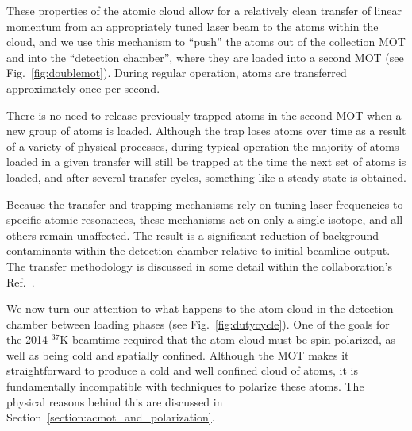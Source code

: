 These properties of the atomic cloud allow for a relatively clean transfer of linear momentum from an appropriately tuned laser beam to the atoms within the cloud, and we use this mechanism to ``push'' the atoms out of the collection MOT and into the ``detection chamber'', where they are loaded into a second MOT (see Fig.~\ref{fig:doublemot}).  During regular operation, atoms are transferred approximately once per second.  

There is no need to release previously trapped atoms in the second MOT when a new group of atoms is loaded.  Although the trap loses atoms over time as a result of a variety of physical processes, during typical operation the majority of atoms loaded in a given transfer will still be trapped at the time the next set of atoms is loaded, and after several transfer cycles, something like a steady state is obtained.

Because the transfer and trapping mechanisms rely on tuning laser frequencies to specific atomic resonances, these mechanisms act on only a single isotope, and all others remain unaffected.  The result is a significant reduction of background contaminants within the detection chamber relative to initial beamline output.  The transfer methodology is discussed in some detail within the collaboration's Ref.~\cite{swanson}.

We now turn our attention to what happens to the atom cloud in the detection chamber between loading phases (see Fig.~\ref{fig:dutycycle}).  One of the goals for the 2014 $^{37}\textrm{K}$ beamtime required that the atom cloud must be spin-polarized, as well as being cold and spatially confined.  Although the MOT makes it straightforward to produce a cold and well confined cloud of atoms, it is fundamentally incompatible with techniques to polarize these atoms. The physical reasons behind this are discussed in Section~\ref{section:acmot_and_polarization}.~

